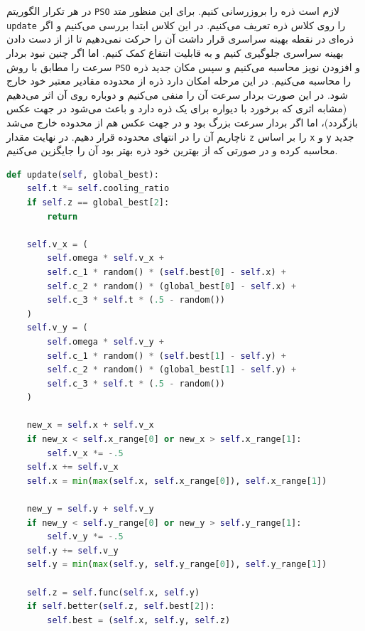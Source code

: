 \documentclass[a4paper, 12pt]{article}
\begin{document}
در هر تکرار الگوریتم
\texttt{PSO}
لازم است ذره را بروزرسانی کنیم. برای این منظور متد
\texttt{update}
را روی کلاس ذره تعریف می‌کنیم. در این کلاس ابتدا بررسی می‌کنیم و اگر ذره‌ای در نقطه بهینه سراسری قرار داشت آن را حرکت نمی‌دهیم تا از از دست دادن بهینه سراسری جلوگیری کنیم و به قابلیت انتفاع کمک کنیم. اما اگر چنین نبود بردار سرعت را مطابق با روش
\texttt{PSO}
و افزودن نویز محاسبه می‌کنیم و سپس مکان جدید ذره را محاسبه می‌کنیم. در این مرحله امکان دارد ذره از محدوده مقادیر معتبر خود خارج شود. در این صورت بردار سرعت آن را منفی می‌کنیم و دوباره روی آن اثر می‌دهیم (مشابه اثری که برخورد با دیواره برای یک ذره دارد و باعث می‌شود در جهت عکس بازگردد)، اما اگر بردار سرعت بزرگ بود و در جهت عکس هم از محدوده خارج می‌شد ناچاریم آن را در انتهای محدوده قرار دهیم. در نهایت مقدار
\texttt{z}
را بر اساس
\texttt{x}
و
\texttt{y}
جدید محاسبه کرده و در صورتی که از بهترین خود ذره بهتر بود آن را جایگزین می‌کنیم.
\newpage
\LTR
\begin{lstlisting}[language=Python]
def update(self, global_best):
    self.t *= self.cooling_ratio
    if self.z == global_best[2]:
        return

    self.v_x = (
        self.omega * self.v_x +
        self.c_1 * random() * (self.best[0] - self.x) +
        self.c_2 * random() * (global_best[0] - self.x) +
        self.c_3 * self.t * (.5 - random())
    )
    self.v_y = (
        self.omega * self.v_y +
        self.c_1 * random() * (self.best[1] - self.y) +
        self.c_2 * random() * (global_best[1] - self.y) +
        self.c_3 * self.t * (.5 - random())
    )

    new_x = self.x + self.v_x
    if new_x < self.x_range[0] or new_x > self.x_range[1]:
        self.v_x *= -.5
    self.x += self.v_x
    self.x = min(max(self.x, self.x_range[0]), self.x_range[1])

    new_y = self.y + self.v_y
    if new_y < self.y_range[0] or new_y > self.y_range[1]:
        self.v_y *= -.5
    self.y += self.v_y
    self.y = min(max(self.y, self.y_range[0]), self.y_range[1])

    self.z = self.func(self.x, self.y)
    if self.better(self.z, self.best[2]):
        self.best = (self.x, self.y, self.z)
\end{lstlisting}
\RTL

\newpage
\end{document}
